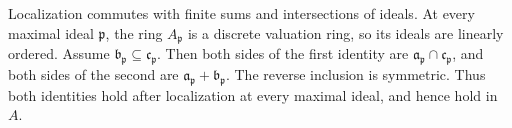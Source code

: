 Localization commutes with finite sums and intersections of ideals. At every maximal ideal $\mathfrak p$, the ring $A_{\mathfrak p}$ is a discrete valuation ring, so its ideals are linearly ordered. Assume $\mathfrak b_{\mathfrak p}\subseteq\mathfrak c_{\mathfrak p}$. Then both sides of the first identity are $\mathfrak a_{\mathfrak p}\cap\mathfrak c_{\mathfrak p}$, and both sides of the second are $\mathfrak a_{\mathfrak p}+\mathfrak b_{\mathfrak p}$. The reverse inclusion is symmetric. Thus both identities hold after localization at every maximal ideal, and hence hold in $A$.
